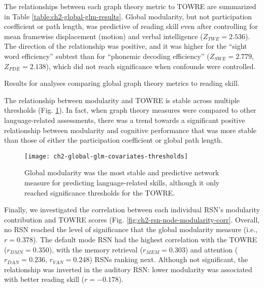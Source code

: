 The relationships between each graph theory metric to TOWRE are summarized in Table \ref{table:ch2-global-glm-results}. Global modularity, but not participation coefficient or path length, was predictive of reading skill even after controlling for mean framewise displacement (motion) and verbal intelligence ($Z_{TWE} = 2.536$). The direction of the relationship was positive, and it was higher for the ``sight word efficiency'' subtest than for ``phonemic decoding efficiency'' ($Z_{SWE} = 2.779$, $Z_{PDE} = 2.138$), which did not reach significance when confounds were controlled. 

\begin{table}[t]
    \renewcommand{\tabcolsep}{0.09cm}
    \centering
    
    \caption{Results for analyses comparing global graph theory metrics to reading skill.}
    \label{table:ch2-global-glm-results}
\end{table}

The relationship between modularity and TOWRE is stable across multiple thresholds (Fig. \ref{fig:ch2-global-glm-covariates-thresh}). In fact, when graph theory measures were compared to other language-related assessments, there was a trend towards a significant positive relationship between modularity and cognitive performance that was more stable than those of either the participation coefficient or global path length. 

\begin{figure}[t]
    \centering
    \texttt{[image: ch2-global-glm-covariates-thresholds]}
    \caption[Modularity metrics at rest are the best predictors of cognitive skills.] {Global modularity was the most stable and predictive network measure for predicting language-related skills, although it only reached significance thresholds for the TOWRE.}
    \label{fig:ch2-global-glm-covariates-thresh}
\end{figure}

Finally, we investigated the correlation between each individual RSN's modularity contribution and TOWRE scores (Fig. \ref{fig:ch2-rsn-node-modularity-corr}. Overall, no RSN reached the level of significance that the global modularity measure (i.e., $r = 0.378$). The default mode RSN had the highest correlation with the TOWRE ($r_{DMN} = 0.350$), with the memory retrieval ($r_{MEM} = 0.303$) and attention ($r_{DAN} = 0.236$, $r_{VAN} = 0.248$) RSNs ranking next. Although not significant, the relationship was inverted in the auditory RSN: lower modularity was associated with better reading skill ($r = -0.178$).

